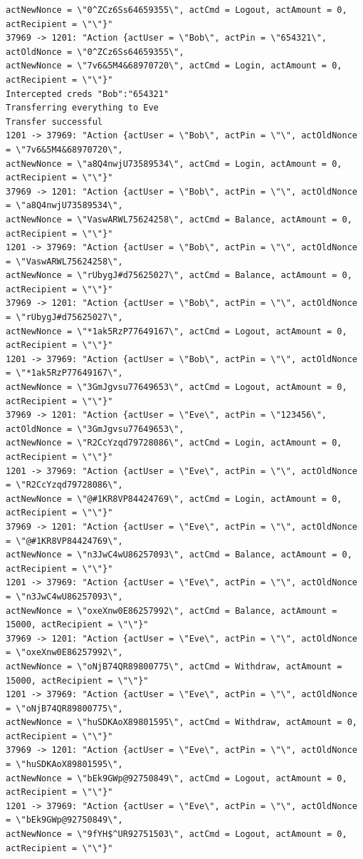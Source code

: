 \documentclass[12pt]{article}
\begin{document}
\begin{Verbatim}[frame=single,fontsize=\scriptsize]
actNewNonce = \"0^ZCz6Ss64659355\", actCmd = Logout, actAmount = 0, actRecipient = \"\"}"
37969 -> 1201: "Action {actUser = \"Bob\", actPin = \"654321\", actOldNonce = \"0^ZCz6Ss64659355\", 
actNewNonce = \"7v6&5M4&68970720\", actCmd = Login, actAmount = 0, actRecipient = \"\"}"
Intercepted creds "Bob":"654321"
Transferring everything to Eve
Transfer successful
1201 -> 37969: "Action {actUser = \"Bob\", actPin = \"\", actOldNonce = \"7v6&5M4&68970720\", 
actNewNonce = \"a8Q4nwjU73589534\", actCmd = Login, actAmount = 0, actRecipient = \"\"}"
37969 -> 1201: "Action {actUser = \"Bob\", actPin = \"\", actOldNonce = \"a8Q4nwjU73589534\", 
actNewNonce = \"VaswARWL75624258\", actCmd = Balance, actAmount = 0, actRecipient = \"\"}"
1201 -> 37969: "Action {actUser = \"Bob\", actPin = \"\", actOldNonce = \"VaswARWL75624258\", 
actNewNonce = \"rUbygJ#d75625027\", actCmd = Balance, actAmount = 0, actRecipient = \"\"}"
37969 -> 1201: "Action {actUser = \"Bob\", actPin = \"\", actOldNonce = \"rUbygJ#d75625027\", 
actNewNonce = \"*1ak5RzP77649167\", actCmd = Logout, actAmount = 0, actRecipient = \"\"}"
1201 -> 37969: "Action {actUser = \"Bob\", actPin = \"\", actOldNonce = \"*1ak5RzP77649167\", 
actNewNonce = \"3GmJgvsu77649653\", actCmd = Logout, actAmount = 0, actRecipient = \"\"}"
37969 -> 1201: "Action {actUser = \"Eve\", actPin = \"123456\", actOldNonce = \"3GmJgvsu77649653\", 
actNewNonce = \"R2CcYzqd79728086\", actCmd = Login, actAmount = 0, actRecipient = \"\"}"
1201 -> 37969: "Action {actUser = \"Eve\", actPin = \"\", actOldNonce = \"R2CcYzqd79728086\", 
actNewNonce = \"@#1KR8VP84424769\", actCmd = Login, actAmount = 0, actRecipient = \"\"}"
37969 -> 1201: "Action {actUser = \"Eve\", actPin = \"\", actOldNonce = \"@#1KR8VP84424769\", 
actNewNonce = \"n3JwC4wU86257093\", actCmd = Balance, actAmount = 0, actRecipient = \"\"}"
1201 -> 37969: "Action {actUser = \"Eve\", actPin = \"\", actOldNonce = \"n3JwC4wU86257093\", 
actNewNonce = \"oxeXnw0E86257992\", actCmd = Balance, actAmount = 15000, actRecipient = \"\"}"
37969 -> 1201: "Action {actUser = \"Eve\", actPin = \"\", actOldNonce = \"oxeXnw0E86257992\", 
actNewNonce = \"oNjB74QR89800775\", actCmd = Withdraw, actAmount = 15000, actRecipient = \"\"}"
1201 -> 37969: "Action {actUser = \"Eve\", actPin = \"\", actOldNonce = \"oNjB74QR89800775\", 
actNewNonce = \"huSDKAoX89801595\", actCmd = Withdraw, actAmount = 0, actRecipient = \"\"}"
37969 -> 1201: "Action {actUser = \"Eve\", actPin = \"\", actOldNonce = \"huSDKAoX89801595\", 
actNewNonce = \"bEk9GWp@92750849\", actCmd = Logout, actAmount = 0, actRecipient = \"\"}"
1201 -> 37969: "Action {actUser = \"Eve\", actPin = \"\", actOldNonce = \"bEk9GWp@92750849\", 
actNewNonce = \"9fYH$^UR92751503\", actCmd = Logout, actAmount = 0, actRecipient = \"\"}"
\end{Verbatim}
\end{document}
